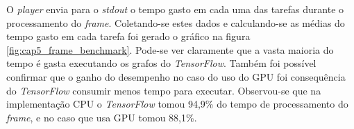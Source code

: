 O \emph{player} envia para o \emph{stdout} o tempo gasto em cada uma das
tarefas durante o processamento do \emph{frame}. Coletando-se estes dados e
calculando-se as médias do tempo gasto em cada tarefa foi gerado o
gráfico na figura \ref{fig:cap5_frame_benchmark}.
Pode-se ver claramente que a vasta maioria do tempo é gasta executando os
grafos do \emph{TensorFlow}. Também foi possível confirmar que o ganho do
desempenho no caso do uso do GPU foi consequência do \emph{TensorFlow}
consumir menos tempo para executar. Observou-se que na implementação CPU
o \emph{TensorFlow} tomou 94,9\% do tempo de processamento do \emph{frame},
e no caso que usa GPU tomou 88,1\%.
